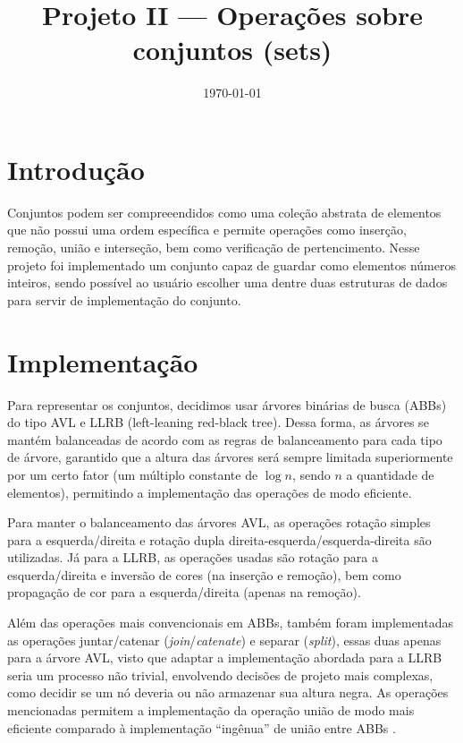 \documentclass[a4paper,12pt]{report}
\title{Projeto \RN{2} --- Operações sobre conjuntos (sets)}
\date{\today}
\begin{document}
\maketitle

\section*{Introdução}

Conjuntos podem ser compreeendidos como uma coleção abstrata de elementos
que não possui uma ordem específica e permite operações como inserção,
remoção, união e interseção, bem como verificação de pertencimento. Nesse
projeto foi implementado um conjunto capaz de guardar como elementos números
inteiros, sendo possível ao usuário escolher uma dentre duas estruturas de 
dados para servir de implementação do conjunto. 

\section*{Implementação}

Para representar os conjuntos, decidimos usar árvores binárias de busca (ABBs)
do tipo AVL e LLRB (left-leaning red-black tree). Dessa forma, as árvores se
mantém balanceadas de acordo com as regras de balanceamento para cada tipo de
árvore, garantido que a altura das árvores será sempre limitada superiormente
por um certo fator (um múltiplo constante de $\log n$, sendo $n$ a quantidade de 
elementos), permitindo a implementação das operações de modo eficiente.

Para manter o balanceamento das árvores AVL, as operações rotação simples 
para a esquerda/direita e rotação dupla direita-esquerda/esquerda-direita
são utilizadas. Já para a LLRB, as operações usadas são rotação para a 
esquerda/direita e inversão de cores (na inserção e remoção), bem como 
propagação de cor para a esquerda/direita (apenas na remoção).

Além das operações mais convencionais em ABBs, também foram implementadas
as operações juntar/catenar (\textit{join}/\textit{catenate}) e separar 
(\textit{split}), essas duas apenas para a árvore AVL, visto que adaptar 
a implementação abordada para a LLRB seria um processo não trivial, 
envolvendo decisões de projeto mais complexas, como decidir se um nó deveria 
ou não armazenar sua altura negra. As operações mencionadas permitem a 
implementação da operação união de modo mais eficiente comparado à implementação 
``ingênua'' de união entre ABBs \parencite{bfs16}.
\end{document}
